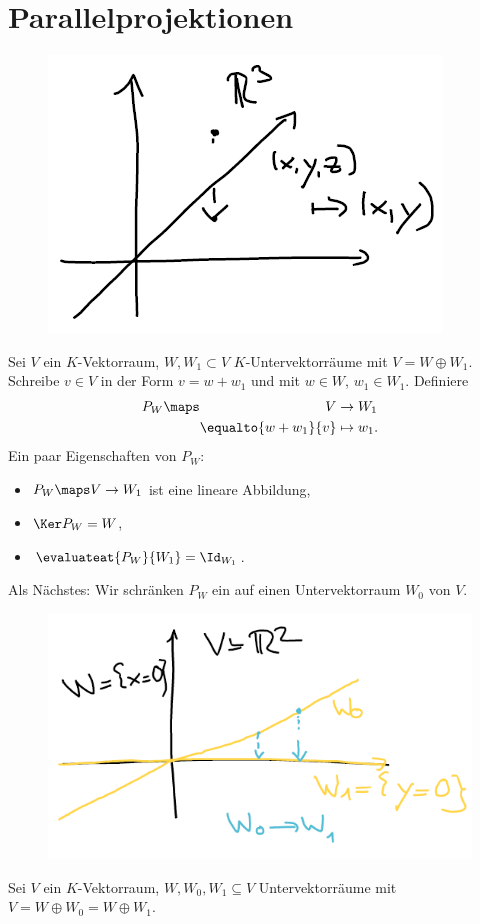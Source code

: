 \section{Parallelprojektionen}
\begin{wiederholung*}
    \begin{beispiel*}
        \begin{figure}[H]
            \centering
            \includegraphics[width=0.5\linewidth]{figures/r_3_projektion}
            \label{fig:r_3_projektion}
        \end{figure}
        
    \end{beispiel*}
    Sei \( V \) ein \( K \)-Vektorraum, \( W, W_1\subset V \) \( K \)-Untervektorräume mit \( V=W\oplus W_1 \).
    Schreibe \( v\in V \) in der Form \( v=w+w_1 \) und mit \( w\in W \), \( w_1\in W_1 \). Definiere
    \begin{align*}
        P_W\maps \begin{aligned}[t] 
            V&\to W_1\\
            \equalto{w+w_1}{v}&\mapsto w_1.
        \end{aligned}
    \end{align*}
    Ein paar Eigenschaften von \( P_W \):
    \begin{itemize}
        \item \( P_W\maps V \to W_1 \) ist eine lineare Abbildung,
        \item \( \Ker P_W=W \),
        \item \( \evaluateat{P_W}{W_1}=\Id_{W_1} \).
    \end{itemize}
    Als Nächstes:
    Wir schränken \( P_W \) ein auf einen Untervektorraum \( W_0 \) von \( V \).
    \begin{figure}[H]
        \centering
        \includegraphics[width=0.5\linewidth]{figures/projektion_einschraenkung_auf_w_0}
        \label{fig:projektion_einschraenkung_auf_w_0}
    \end{figure}
    \begin{lemma}\label{projektion_isomorph}
        Sei \( V \) ein \( K \)-Vektorraum, \( W,W_0, W_1\subseteq V \) Untervektorräume mit \( V=W\oplus W_0=W\oplus W_1 \).


\end{lemma}
\end{wiederholung*}
